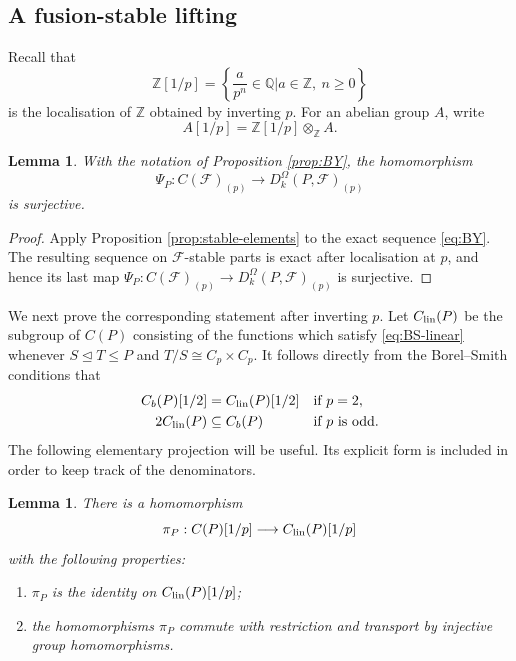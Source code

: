 \documentclass[preprint,12pt,3p]{elsarticle}
\newtheorem{lemma}[theorem]{Lemma}
\def\F{\mathcal{F}}
\def\Z{\mathbb{Z}}
\begin{document}
\subsection{A fusion-stable lifting}

Recall that
$$
 \Z[1/p]=\left\{\frac{a}{p^n}\in\mathbb{Q}\mathrel{\big|}a\in\Z,\ n\geq 0\right\}
$$
is the localisation of $\Z$ obtained by inverting $p$. For an abelian group $A$, write
$$
 A[1/p]=\Z[1/p]\otimes_\Z A.
$$

\begin{lemma}\label{lem:p-local}
With the notation of Proposition \ref{prop:BY}, the homomorphism
$$
 \Psi_P:C(\F)_{(p)}\longrightarrow D_k^\Omega(P,\F)_{(p)}
$$
is surjective.
\end{lemma}

\begin{proof}
Apply Proposition \ref{prop:stable-elements} to the exact sequence \eqref{eq:BY}. The resulting sequence on $\F$-stable parts is exact after localisation at $p$, and hence its last map $\Psi_P:C(\F)_{(p)}\to D_k^\Omega(P,\F)_{(p)}$ is surjective.
\end{proof}

We next prove the corresponding statement after inverting $p$. Let $C_{\rm lin}(P)$ be the subgroup of $C(P)$ consisting of the functions which satisfy \eqref{eq:BS-linear} whenever $S\trianglelefteq T\leq P$ and $T/S\cong C_p\times C_p$. It follows directly from the Borel--Smith conditions that
\begin{equation}\label{eq:Cb-Cl}
 \begin{aligned}
 C_b(P)[1/2]&=C_{\rm lin}(P)[1/2] &&\text{if }p=2,\\
 2C_{\rm lin}(P)&\subseteq C_b(P) &&\text{if }p\text{ is odd}.
 \end{aligned}
\end{equation}
The following elementary projection will be useful.  Its explicit form is included in order to keep track of the denominators.

\begin{lemma}\label{lem:projection}
There is a homomorphism
$$
 \pi_P:C(P)[1/p]\longrightarrow C_{\rm lin}(P)[1/p]
$$
with the following properties:
\begin{enumerate}
\item $\pi_P$ is the identity on $C_{\rm lin}(P)[1/p]$;
\item the homomorphisms $\pi_P$ commute with restriction and transport by injective group homomorphisms.
\end{enumerate}
\end{lemma}
\end{document}
